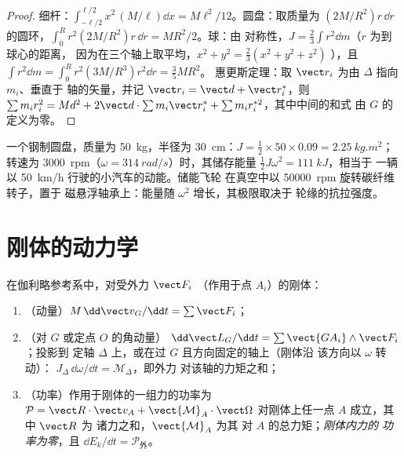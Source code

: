 \begin{proof}
细杆：$\int_{-\ell/2}^{\ell/2}x^2\,(M/\ell)\dd x = M\ell^2/12$。圆盘：取质量为
$(2M/R^2)r\,\dd r$ 的圆环，$\int_0^R r^2(2M/R^2)r\,\dd r = MR^2/2$。球：由
对称性，$J = \tfrac23\int r^2\dd m$（$r$ 为到球心的距离，
因为在三个轴上取平均，$x^2 + y^2 = \tfrac23(x^2 + y^2 + z^2)$
），且 $\int r^2\dd m = \int_0^R r^2(3M/R^3)r^2\dd r = \tfrac35MR^2$。
惠更斯定理：取 $\vect r_i$ 为由 $\Delta$ 指向 $m_i$、垂直于
轴的矢量，并记 $\vect r_i = \vect d + \vect r_i^*$，则 $\sum m_ir_i^2 = Md^2
+ 2\vect d\cdot\sum m_i\vect r_i^* + \sum m_ir_i^{*2}$，其中中间的和式
由 $G$ 的定义为零。
\end{proof}

\begin{example}[飞轮]\label{ex:b2:rigid-body-mechanics:flywheel}
一个钢制圆盘，质量为 \qty{50}{kg}，半径为 \qty{30}{cm}：$J = \tfrac12 \times
50 \times 0.09 = \qty{2.25}{kg.m^2}$；转速为 \qty{3000}{rpm}（$\omega =
\qty{314}{rad/s}$）时，其储存能量 $\tfrac12J\omega^2 = \qty{111}{kJ}$，相当于
一辆以 \qty{50}{km/h} 行驶的小汽车的动能。储能飞轮
在真空中以 \qty{50000}{rpm} 旋转碳纤维转子，置于
磁悬浮轴承上：能量随 $\omega^2$ 增长，其极限取决于
轮缘的抗拉强度。
\end{example}

\section{刚体的动力学}

\begin{theorem}[刚体的运动定律]\label{thm:b2:rigid-body-mechanics:laws}
在伽利略参考系中，对受外力 $\vect F_i$
（作用于点 $A_i$）的刚体：
\begin{enumerate}
  \item （动量）$M\,\dd\vect v_G/\dd t = \sum\vect F_i$；
  \item （对 $G$ 或定点 $O$ 的角动量）
        $\dd\vect L_G/\dd t = \sum\vect{GA_i}\wedge\vect F_i$；投影到
        定轴 $\Delta$ 上，或在过 $G$ 且方向固定的轴上（刚体沿
        该方向以 $\omega$ 转动）：
        $J_\Delta\,\dd\omega/\dd t = \mathcal M_\Delta$，即外力
        对该轴的力矩之和；
  \item （功率）作用于刚体的一组力的功率为
        $\mathcal P = \vect R\cdot\vect v_A + \vect{\mathcal M}_A\cdot
        \vect\Omega$ 对刚体上任一点 $A$ 成立，其中 $\vect R$ 为
        诸力之和，$\vect{\mathcal M}_A$ 为其
        对 $A$ 的总力矩；\emph{刚体内力的
        功率为零}，且 $\dd E_k/\dd t = \mathcal P_{\text{外}}$。
\end{enumerate}
\end{theorem}

